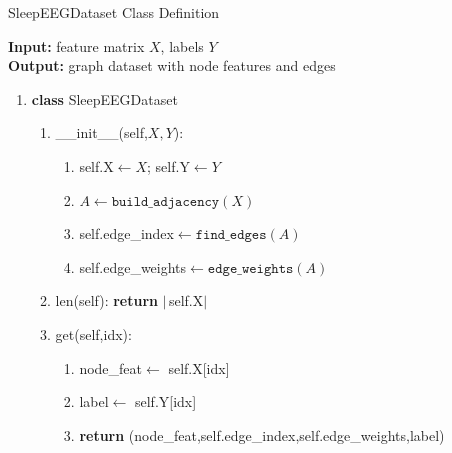 \begin{algorithm}[H]
	\caption{SleepEEGDataset Class Definition}
	\label{alg:sleepdataset}
	\textbf{Input:} feature matrix $X$, labels $Y$\\
	\textbf{Output:} graph dataset with node features and edges
	\begin{enumerate}
		\item \textbf{class} SleepEEGDataset
		\begin{enumerate}
			\item \_\_init\_\_(self,$X,Y$):
			\begin{enumerate}
				\item self.X$\leftarrow X$; self.Y$\leftarrow Y$
				\item $A\leftarrow\texttt{build\_adjacency}(X)$
				\item self.edge\_index$\leftarrow \texttt{find\_edges}(A)$
				\item self.edge\_weights$\leftarrow \texttt{edge\_weights}(A)$
			\end{enumerate}
			\item len(self): \textbf{return} $|\,$self.X$|$
			\item get(self,idx):
			\begin{enumerate}
				\item node\_feat$\leftarrow$ self.X[idx]
				\item label$\leftarrow$ self.Y[idx]
				\item \textbf{return} (node\_feat,self.edge\_index,self.edge\_weights,label)
			\end{enumerate}
		\end{enumerate}
	\end{enumerate}
\end{algorithm}

